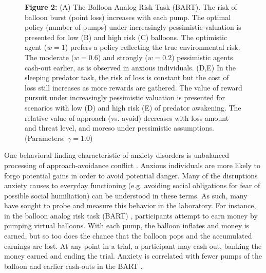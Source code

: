\documentclass[11pt]{article} %
\begin{document}
\begin{figure}
  \centerline{%
  }
  \par \textbf{Figure 2:} (A) The Balloon Analog Risk Task (BART)\citep{Lejuez2002,Maner2007, ramirez2015}. The risk of balloon burst (point loss) increases with each pump. The optimal policy (number of pumps) under increasingly pessimistic valuation is presented for low (B) and high risk (C) balloons. The optimistic agent ($w=1$) prefers a policy reflecting the true environmental risk. The moderate ($w=0.6$) and strongly ($w=0.2$) pessimistic agents cash-out earlier, as is observed in anxious individuals. (D,E) In the sleeping predator task, the risk of loss is constant but the cost of loss still increases as more rewards are gathered. The value of reward pursuit under increasingly pessimistic valuation is presented for scenarios with low (D) and high risk (E)  of predator awakening. The relative value of approach (vs. avoid) decreases with loss amount and threat level, and moreso under pessimistic assumptions. (Parameters: $\gamma = 1.0$)
\end{figure}

One behavioral finding characteristic of anxiety disorders is unbalanced processing of approach-avoidance conflict \citep{aupperle2010}. Anxious individuals are more likely to forgo potential gains in order to avoid potential danger. Many of the disruptions anxiety causes to everyday functioning (e.g. avoiding social obligations for fear of possible social humiliation) can be understood in these terms. As such, many have sought to probe and measure this behavior in the laboratory. For instance, in the balloon analog risk task (BART) \citep{Lejuez2002}, participants attempt to earn money by pumping virtual balloons. With each pump, the balloon inflates and money is earned, but so too does the chance that the balloon pops and the accumulated earnings are lost. At any point in a trial, a participant may cash out, banking the money earned and ending the trial. Anxiety is correlated with fewer pumps of the balloon and earlier cash-outs in the BART \citep{Maner2007, ramirez2015}.
\end{document}
